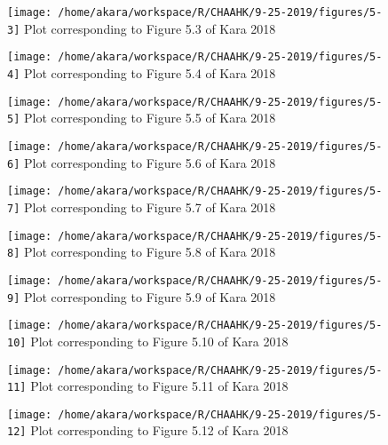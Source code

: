 \documentclass{article}
\begin{document}
\begin{figure}[H]
	\texttt{[image: /home/akara/workspace/R/CHAAHK/9-25-2019/figures/5-3]}
	Plot corresponding to Figure 5.3 of Kara 2018
	\label{fig:5-3}
\end{figure}
\begin{figure}[H]
	\texttt{[image: /home/akara/workspace/R/CHAAHK/9-25-2019/figures/5-4]}
	Plot corresponding to Figure 5.4 of Kara 2018
	\label{fig:5-4}
\end{figure}
\begin{figure}[H]
	\texttt{[image: /home/akara/workspace/R/CHAAHK/9-25-2019/figures/5-5]}
	Plot corresponding to Figure 5.5 of Kara 2018
	\label{fig:5-5}
\end{figure}
\begin{figure}[H]
	\texttt{[image: /home/akara/workspace/R/CHAAHK/9-25-2019/figures/5-6]}
	Plot corresponding to Figure 5.6 of Kara 2018
	\label{fig:5-6}
\end{figure}
\begin{figure}[H]
	\texttt{[image: /home/akara/workspace/R/CHAAHK/9-25-2019/figures/5-7]}
	Plot corresponding to Figure 5.7 of Kara 2018
	\label{fig:5-7}
\end{figure}
\begin{figure}[H]
	\texttt{[image: /home/akara/workspace/R/CHAAHK/9-25-2019/figures/5-8]}
	Plot corresponding to Figure 5.8 of Kara 2018
	\label{fig:5-8}
\end{figure}
\begin{figure}[H]
	\texttt{[image: /home/akara/workspace/R/CHAAHK/9-25-2019/figures/5-9]}
	Plot corresponding to Figure 5.9 of Kara 2018
	\label{fig:5-9}
\end{figure}
\begin{figure}[H]
	\texttt{[image: /home/akara/workspace/R/CHAAHK/9-25-2019/figures/5-10]}
	Plot corresponding to Figure 5.10 of Kara 2018
	\label{fig:5-10}
\end{figure}
\begin{figure}[H]
	\texttt{[image: /home/akara/workspace/R/CHAAHK/9-25-2019/figures/5-11]}
	Plot corresponding to Figure 5.11 of Kara 2018
	\label{fig:5-11}
\end{figure}
\begin{figure}[H]
	\texttt{[image: /home/akara/workspace/R/CHAAHK/9-25-2019/figures/5-12]}
	Plot corresponding to Figure 5.12 of Kara 2018
	\label{fig:5-12}
\end{figure}
\end{document}
